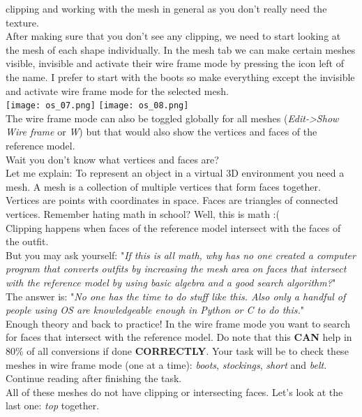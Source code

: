 clipping and working with the mesh in general as you don't really need the texture.\\
After making sure that you don't see any clipping, we need to start looking at the mesh of each shape individually. In the mesh 
tab we can make certain meshes visible, invisible and activate their wire frame mode by pressing the icon left of the name.
I prefer to start with the boots so make everything except the {\color{green}{reference model}} invisible and activate wire frame mode for the selected mesh.\\
\linebreak
\texttt{[image: os\_07.png]}
\texttt{[image: os\_08.png]}\\
The wire frame mode can also be toggled globally for all meshes (\textit{Edit->Show Wire frame} or \textit{W}) but that would also 
show the vertices and faces of the reference model.\\ Wait you don't know what vertices and faces are?\\
Let me explain: To represent an object in a virtual 3D environment you need a mesh. A mesh is a collection of multiple vertices 
that form faces together. Vertices are points with coordinates in space. Faces are triangles of connected vertices. Remember 
hating math in school? Well, this is math :(\\
Clipping happens when faces of the reference model intersect with the faces of the outfit.\\ But you may ask yourself:
"\textit{If this is all math, why has no one created a computer program that converts outfits by increasing the mesh area on faces 
that intersect with the reference model by using basic algebra and a good search algorithm?}"\\ The answer is: "\textit{No one has 
the time to do stuff like this. Also only a handful of people using OS are knowledgeable enough in Python or C to do this.}"\\
Enough theory and back to practice! In the wire frame mode you want to search for faces that intersect with the reference model. 
Do note that this \textbf{CAN} help in 80\% of all conversions if done \textbf{CORRECTLY}. Your task will be to check these meshes 
in wire frame mode (one at a time): \textit{boots}, \textit{stockings}, \textit{short} and \textit{belt}. Continue reading after finishing the task.\\
All of these meshes do not have clipping or intersecting faces. Let's look at the last one: \textit{top} together.
